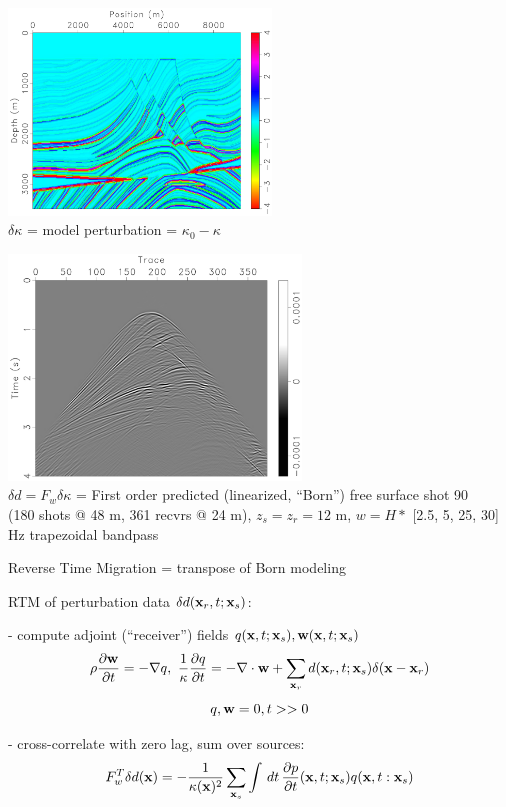 \documentclass[xcolor=dvipsnames,12pt,aspectratio=169]{beamer}
\begin{document}
\begin{frame}
\vspace{-0.5 cm}
\begin{center}
\includegraphics[height=5.5cm]{Fig/fine1dbulk}\\
$\delta \kappa$ = model perturbation = $\kappa_0-\kappa$
\end{center}
\end{frame}

\begin{frame}
\begin{center}
\includegraphics[height=6cm]{Fig/fine1bornr90}\\
$\delta d = F_w\delta \kappa$ = First order predicted (linearized,
``Born'') free surface shot 90 \\(180 shots @ 48 m, 361 recvrs @ 24 m), $z_s=z_r=12$ m, $w = H * $ [2.5, 5, 25, 30] Hz trapezoidal bandpass
\end{center}
\end{frame}

\begin{frame}
Reverse Time Migration = transpose of Born modeling

RTM of perturbation data $\delta d(\mathbf{x}_r,t;\mathbf{x}_s)$:

- compute adjoint (``receiver'') fields $q(\mathbf{x},t;\mathbf{x}_s), \mathbf{w}(\mathbf{x},t;\mathbf{x}_s)$
\[
\rho \frac{\partial \mathbf{w}}{\partial t} = - \nabla q,\,\,
\frac{1}{\kappa}\frac{\partial q}{\partial t} = - \nabla \cdot \mathbf{w} + \sum_{\mathbf{x}_r} d(\mathbf{x}_r,t;\mathbf{x}_s) \delta(\mathbf{x}-\mathbf{x}_r)
\]
\[
q, \mathbf{w} = 0, t >>0
\]

- cross-correlate with zero lag, sum over sources:
\[
F_w^T\delta d(\mathbf{x}) = -\frac{1}{\kappa(\mathbf{x})^2}\sum_{\mathbf{x}_s} \int\,dt\,\frac{\partial p}{\partial t}(\mathbf{x},t;\mathbf{x}_s)q(\mathbf{x},t:\mathbf{x}_s) 
\]
\end{frame}
\end{document}
